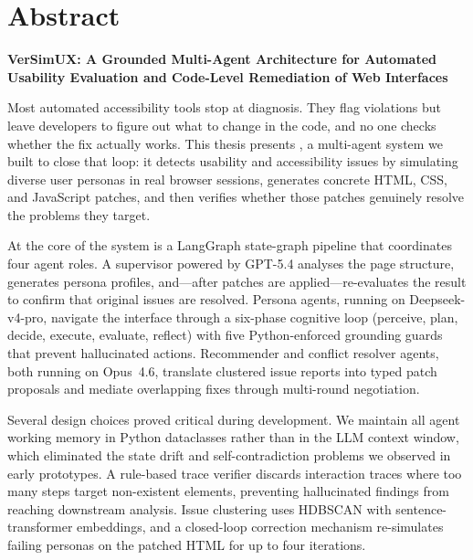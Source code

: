 \chapter*{Abstract}
\thispagestyle{plain}

\noindent
\textbf{VerSimUX: A Grounded Multi-Agent Architecture for Automated Usability Evaluation and Code-Level Remediation of Web Interfaces}

\vspace{1em}

Most automated accessibility tools stop at diagnosis. They flag violations but leave developers to figure out what to change in the code, and no one checks whether the fix actually works. This thesis presents \versimux{}, a multi-agent system we built to close that loop: it detects usability and accessibility issues by simulating diverse user personas in real browser sessions, generates concrete HTML, CSS, and JavaScript patches, and then verifies whether those patches genuinely resolve the problems they target.

At the core of the system is a LangGraph state-graph pipeline that coordinates four agent roles. A supervisor powered by GPT-5.4 analyses the page structure, generates persona profiles, and---after patches are applied---re-evaluates the result to confirm that original issues are resolved. Persona agents, running on Deepseek-v4-pro, navigate the interface through a six-phase cognitive loop (perceive, plan, decide, execute, evaluate, reflect) with five Python-enforced grounding guards that prevent hallucinated actions. Recommender and conflict resolver agents, both running on Opus~4.6, translate clustered issue reports into typed patch proposals and mediate overlapping fixes through multi-round negotiation.

Several design choices proved critical during development. We maintain all agent working memory in Python dataclasses rather than in the LLM context window, which eliminated the state drift and self-contradiction problems we observed in early prototypes. A rule-based trace verifier discards interaction traces where too many steps target non-existent elements, preventing hallucinated findings from reaching downstream analysis. Issue clustering uses HDBSCAN with sentence-transformer embeddings, and a closed-loop correction mechanism re-simulates failing personas on the patched HTML for up to four iterations.

